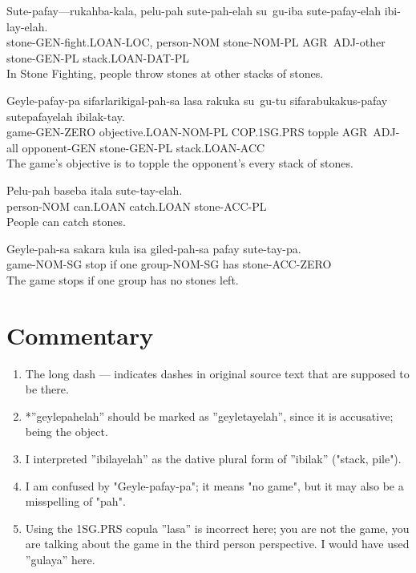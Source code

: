 \documentclass{thiguka}
\begin{document}
\begin{exe}
\ex{} \gll{}Sute-pafay---rukahba-kala, pelu-pah sute-pah-elah su~gu-iba sute-pafay-elah ibi-lay-elah.\\
            stone-GEN-fight.LOAN-LOC, person-NOM stone-NOM-PL AGR~ADJ-other stone-GEN-PL stack.LOAN-DAT-PL\\
      \glt{}In Stone Fighting, people throw stones at other stacks of stones.
\end{exe}

\begin{exe}
\ex{} \gll{}Geyle-pafay-pa sifarlarikigal-pah-sa lasa rakuka su~gu-tu sifarabukakus-pafay sutepafayelah ibilak-tay.\\
            game-GEN-ZERO objective.LOAN-NOM-PL COP.1SG.PRS topple AGR~ADJ-all opponent-GEN stone-GEN-PL stack.LOAN-ACC\\
      \glt{}The game's objective is to topple the opponent's every stack of stones.
\end{exe}

\begin{exe}
\ex{} \gll{}Pelu-pah baseba itala sute-tay-elah.\\
            person-NOM can.LOAN catch.LOAN stone-ACC-PL\\
      \glt{}People can catch stones.
\end{exe}

\begin{exe}
\ex{} \gll{}Geyle-pah-sa sakara kula isa giled-pah-sa pafay sute-tay-pa.\\
            game-NOM-SG stop if one group-NOM-SG has stone-ACC-ZERO\\
      \glt{}The game stops if one group has no stones left.
\end{exe}

\newpage

\section{Commentary}
\begin{enumerate}
    \item The long dash --- indicates dashes in original source text that are supposed to be there.
    \item *''geylepahelah'' should be marked as ''geyletayelah'', since it is accusative; being the object.
    \item I interpreted ''ibilayelah'' as the dative plural form of ''ibilak'' ("stack, pile").
    \item I am confused by "Geyle-pafay-pa"; it means "no game", but it may also be a misspelling of "pah".
    \item Using the 1SG.PRS copula ''lasa'' is incorrect here; you are not the game, you are talking about the game in the third person perspective. I would have used ''gulaya'' here.
\end{enumerate}
\end{document}
